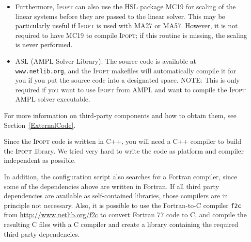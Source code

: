 \documentclass[10pt]{article}
\newcommand{\Ipopt}{\textsc{Ipopt}\xspace}
\begin{document}
\begin{itemize}
  \textbf{NOTE: The solution of the linear systems is a central
    ingredient in \Ipopt and the optimizer's performance and
    robustness depends on your choice.  The best choice depends on
    your application, and it makes sense to try different options.
    Most of the solvers also rely on efficient BLAS code (see above),
    so you should use a good BLAS library tailored to your system.
    Please keep this in mind, particularly when you are comparing
    \Ipopt with other optimization codes.}

  If you are compiling MA57, HSL\_MA77, HSL\_MA86, HSL\_MA97, or MUMPS within
  the \Ipopt build
  system, you should also include the METIS linear system ordering package.

  Interfaces to other linear solvers might be added in the future; if
  you are interested in contributing such an interface please contact
  us!  Note that \Ipopt requires that the linear solver is able to
  provide the inertia (number of positive and negative eigenvalues) of
  the symmetric matrix that is factorized.

\item Furthermore, \Ipopt can also use the HSL package MC19
  for scaling of the linear systems before they are passed to the
  linear solver.  This may be particularly useful if \Ipopt is used
  with MA27 or MA57.  However, it is not required to have MC19 to
  compile \Ipopt; if this routine is missing, the scaling is never
  performed.
\item ASL (AMPL Solver Library).  The source code is available at {\tt
    www.netlib.org}, and the \Ipopt makefiles will automatically
  compile it for you if you put the source code into a designated
  space.  NOTE: This is only required if you want to use \Ipopt from
  AMPL and want to compile the \Ipopt AMPL solver executable.
\end{itemize}
For more information on third-party components and how to obtain them,
see Section~\ref{ExternalCode}.

Since the \Ipopt code is written in C++, you will need a C++ compiler
to build the \Ipopt library.  We tried very hard to write the code as
platform and compiler independent as possible.

In addition, the configuration script also searches for a Fortran
compiler, since some of the dependencies above are written in Fortran.
If all third party dependencies are available as self-contained
libraries, those compilers are in principle not necessary.  Also, it
is possible to use the Fortran-to-C compiler {\tt f2c} from
\url{http://www.netlib.org/f2c} to convert Fortran 77 code to C, and compile the
resulting C files with a C compiler and create a library containing
the required third party dependencies.  %
\end{document}
